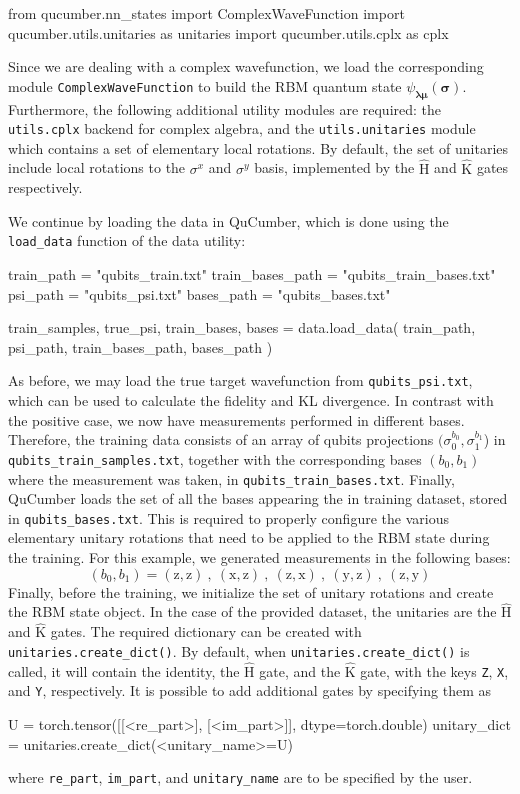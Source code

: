 \documentclass[submission, Phys, hidelnks]{SciPost}
\begin{document}
\begin{python}
from qucumber.nn_states import ComplexWaveFunction
import qucumber.utils.unitaries as unitaries
import qucumber.utils.cplx as cplx
\end{python}
Since we are dealing with a complex wavefunction, we load the corresponding module
\verb|ComplexWaveFunction| to build the RBM quantum state
$\psi_{\bm{\lambda\mu}}(\bm{\sigma})$. Furthermore, the following additional
utility modules are required: the \verb|utils.cplx| backend for complex algebra,
and the \verb|utils.unitaries| module  which contains a set of elementary local
rotations. By default, the set of unitaries include local rotations to the
$\sigma^x$ and $\sigma^y$ basis, implemented by the $\hat{\mathrm{H}}$ and
$\hat{\mathrm{K}}$ gates respectively.

We continue by loading the data in QuCumber, which is done using the
\verb|load_data| function of the data utility:
\begin{python}
train_path = "qubits_train.txt"
train_bases_path = "qubits_train_bases.txt"
psi_path = "qubits_psi.txt"
bases_path = "qubits_bases.txt"

train_samples, true_psi, train_bases, bases = data.load_data(
  train_path, psi_path, train_bases_path, bases_path
)
\end{python}
As before, we may load the true target wavefunction from \verb|qubits_psi.txt|,
which can be used to calculate the fidelity and KL divergence. In contrast with
the positive case, we now have measurements performed in different bases.
Therefore, the training data consists of an array of qubits projections
$(\sigma_0^{b_0},\sigma_1^{b_1}$) in \verb|qubits_train_samples.txt|, together
with the corresponding bases $(b_0,b_1)$ where the measurement was taken, in
\verb|qubits_train_bases.txt|. Finally, QuCumber loads the set of all the bases
appearing the in training dataset, stored in \verb|qubits_bases.txt|. This is
required to properly configure the various elementary unitary rotations that
need to be applied to the RBM state during the training. For this example, we
generated measurements in the following bases:
\begin{equation}
    (b_0, b_1)=(\mathrm{z},\mathrm{z})\:,\:(\mathrm{x},\mathrm{z})\:,\:(\mathrm{z},\mathrm{x})\:,\:(\mathrm{y},\mathrm{z})\:,\:(\mathrm{z},\mathrm{y})
\end{equation}
Finally, before the training, we initialize the set of unitary rotations and
create the RBM state object. In the case of the provided dataset, the unitaries
are the $\hat{\mathrm{H}}$ and $\hat{\mathrm{K}}$ gates. The required dictionary
can be created with \verb|unitaries.create_dict()|.
By default, when \verb|unitaries.create_dict()| is called, it will contain the
identity, the $\hat{\mathrm{H}}$ gate, and the $\hat{\mathrm{K}}$ gate, with the
keys \verb|Z|, \verb|X|, and \verb|Y|, respectively. It is possible to add
additional gates by specifying them as
\begin{python}
U = torch.tensor([[<re_part>], [<im_part>]], dtype=torch.double)
unitary_dict = unitaries.create_dict(<unitary_name>=U)
\end{python}
where \verb|re_part|, \verb|im_part|, and \verb|unitary_name| are to be
specified by the user.
\end{document}
